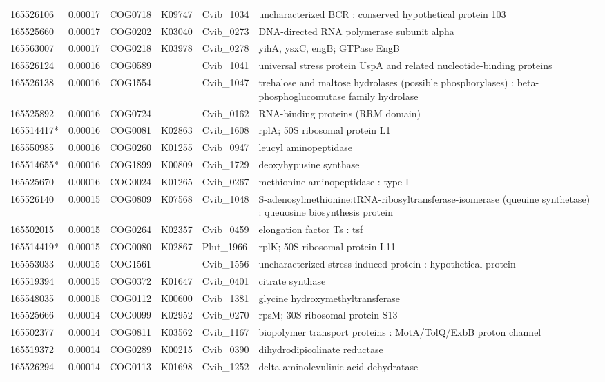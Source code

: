 \begin{landscape}
\begin{longtable}{p{1.8cm}p{0.9cm}p{2.2cm}p{1cm}p{2.8cm}p{13.4cm}}
165526106&0.00017&COG0718&K09747&Cvib\_1034&uncharacterized BCR : conserved hypothetical protein 103 \\
165525660&0.00017&COG0202&K03040&Cvib\_0273&DNA-directed RNA polymerase subunit alpha \\
165563007&0.00017&COG0218&K03978&Cvib\_0278&yihA, ysxC, engB; GTPase EngB \\
165526124&0.00016&COG0589&&Cvib\_1041&universal stress protein UspA and related nucleotide-binding proteins \\
165526138&0.00016&COG1554&&Cvib\_1047&trehalose and maltose hydrolases (possible phosphorylases) : beta-phosphoglucomutase family hydrolase \\
165525892&0.00016&COG0724&&Cvib\_0162&RNA-binding proteins (RRM domain) \\
165514417*&0.00016&COG0081&K02863&Cvib\_1608&rplA; 50S ribosomal protein L1 \\
165550985&0.00016&COG0260&K01255&Cvib\_0947&leucyl aminopeptidase \\
165514655*&0.00016&COG1899&K00809&Cvib\_1729&deoxyhypusine synthase \\
165525670&0.00016&COG0024&K01265&Cvib\_0267&methionine aminopeptidase : type I \\
165526140&0.00015&COG0809&K07568&Cvib\_1048&S-adenosylmethionine:tRNA-ribosyltransferase-isomerase (queuine synthetase) : queuosine biosynthesis protein \\
165502015&0.00015&COG0264&K02357&Cvib\_0459&elongation factor Ts : tsf \\
165514419*&0.00015&COG0080&K02867&Plut\_1966&rplK; 50S ribosomal protein L11 \\
165553033&0.00015&COG1561&&Cvib\_1556&uncharacterized stress-induced protein : hypothetical protein \\
165519394&0.00015&COG0372&K01647&Cvib\_0401&citrate synthase \\
165548035&0.00015&COG0112&K00600&Cvib\_1381&glycine hydroxymethyltransferase \\
165525666&0.00014&COG0099&K02952&Cvib\_0270&rpsM; 30S ribosomal protein S13 \\
165502377&0.00014&COG0811&K03562&Cvib\_1167&biopolymer transport proteins : MotA/TolQ/ExbB proton channel \\
165519372&0.00014&COG0289&K00215&Cvib\_0390&dihydrodipicolinate reductase \\
165526294&0.00014&COG0113&K01698&Cvib\_1252&delta-aminolevulinic acid dehydratase \\

\end{longtable}
\end{landscape}
